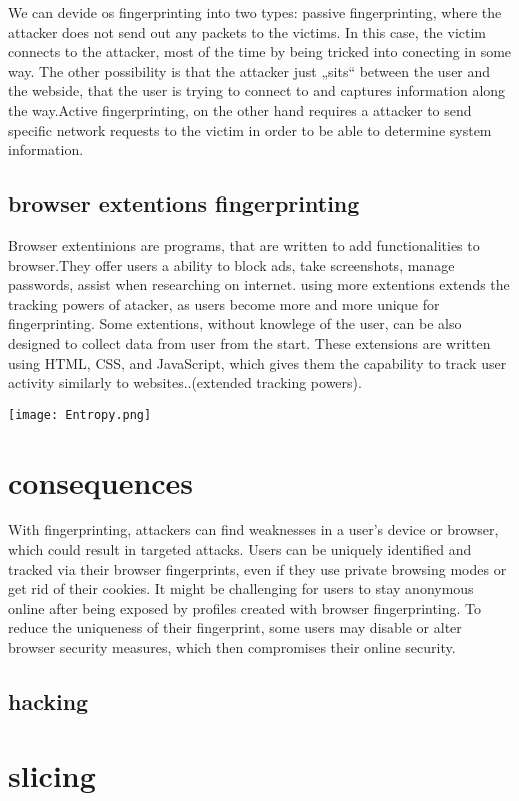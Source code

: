 \documentclass[10pt,a4paper,column]{article}
\begin{document}
We can devide os fingerprinting into two types: passive fingerprinting, where the attacker does not send out any packets to the victims. In this case, the victim connects to the attacker, most of the time by being tricked into conecting in some way. The other possibility is that the attacker just „sits“ between the user and the webside, that the user is trying to connect to and captures information along the way.Active fingerprinting, on the other hand requires a attacker to send specific network requests to the victim in order to be able to determine system information. 

\subsection{browser extentions fingerprinting}
Browser extentinions are programs, that are written to add functionalities to browser.They offer users a ability to block ads, take screenshots, manage passwords, assist when researching on internet. using more extentions extends the tracking powers of atacker, as  users become more and more unique for fingerprinting. Some extentions, without knowlege of the user, can be also designed to collect data from user from the start. These extensions are written using HTML, CSS, and JavaScript, which gives them the capability to track user activity similarly to websites..(extended tracking powers).
\begin{center}
\texttt{[image: Entropy.png]}
\end{center}
\section{consequences}
With fingerprinting, attackers can find weaknesses in a user's device or browser, which could result in targeted attacks. Users can be uniquely identified and tracked via their browser fingerprints, even if they use private browsing modes or get rid of their cookies. It might be challenging for users to stay anonymous online after being exposed by profiles created with browser fingerprinting. To reduce the uniqueness of their fingerprint, some users may disable or alter browser security measures, which then compromises their online security.
\subsection{hacking}

\section{slicing} 
\end{document}
